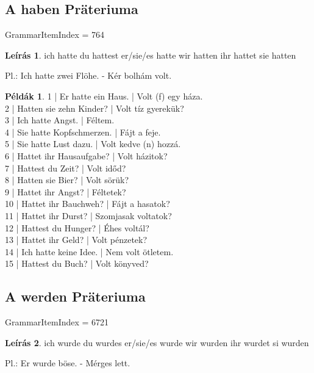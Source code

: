 \documentclass{article}
\theoremstyle{definition}
\newtheorem*{exmp}{Példák}
\newtheorem*{desc}{Leírás}
\begin{document}
\subsection{A haben Präteriuma}

GrammarItemIndex = 764

\begin{desc}
ich hatte
du hattest
er/sie/es hatte
wir hatten
ihr hattet
sie hatten

Pl.: Ich hatte zwei Flöhe. - Kér bolhám volt.
\end{desc}

\begin{exmp}
1 | Er hatte ein Haus. | Volt (f) egy háza.\\
2 | Hatten sie zehn Kinder? | Volt tíz gyerekük?\\
3 | Ich hatte Angst. | Féltem.\\
4 | Sie hatte Kopfschmerzen. | Fájt a feje.\\
5 | Sie hatte Lust dazu. | Volt kedve (n) hozzá.\\
6 | Hattet ihr Hausaufgabe? | Volt házitok?\\
7 | Hattest du Zeit? | Volt időd?\\
8 | Hatten sie Bier? | Volt sörük?\\
9 | Hattet ihr Angst? | Féltetek?\\
10 | Hattet ihr Bauchweh? | Fájt a hasatok?\\
11 | Hattet ihr Durst? | Szomjasak voltatok?\\
12 | Hattest du Hunger? | Éhes voltál?\\
13 | Hattet ihr Geld? | Volt pénzetek?\\
14 | Ich hatte keine Idee. | Nem volt ötletem.\\
15 | Hattest du Buch? | Volt könyved?\\
\end{exmp}

\subsection{A werden Präteriuma}

GrammarItemIndex = 6721

\begin{desc}
ich wurde
du wurdes
er/sie/es wurde
wir wurden
ihr wurdet
si wurden

Pl.: Er wurde böse. - Mérges lett.
\end{desc}
\end{document}
